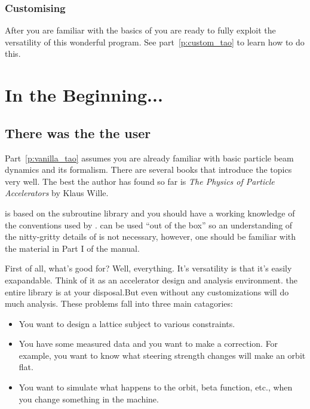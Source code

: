 \documentclass{report}
\begin{document}
\subsection{Customising \tao}

After you are familiar with the basics of \tao you are ready to fully exploit
the versatility of this wonderful program. See part~\ref{p:custom_tao} to learn
how to do this.

\chapter{In the Beginning...}
\label{c:beginning}

\section{There was the the user}

Part~\ref{p:vanilla_tao} assumes you are already familiar with basic particle beam
dynamics and its formalism. There are several books that introduce the topics
very well. The best the author has found so far is \textit{The Physics of
Particle Accelerators} by Klaus Wille. 

\tao is based on the \bmad subroutine library and you should have
a working knowledge of the conventions used by \bmad. \tao can be used ``out of
the box'' so an understanding of the nitty-gritty details of \bmad is not
necessary, however, one should be familiar with the material in Part I
of the \bmad manual.

First of all, what's \tao good for? Well, everything. It's versatility is that
it's easily exapandable. Think of it as an accelerator design and analysis
environment. the entire \bmad library is at your disposal.But even without any 
customizations \tao will do much analysis. These problems fall into three main
catagories:

\begin{itemize}
\item 
You want to design a lattice subject to various constraints.
\item 
You have some measured data and you want to make a correction. For
example, you want to know what steering strength changes will make an orbit
flat.
\item
You want to simulate what happens to the orbit, beta function,
etc., when you change something in the machine.
\end{itemize}
\end{document}

